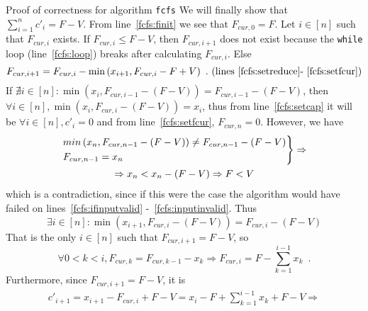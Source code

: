 \begin{sepproof}{Proof of correctness for algorithm \texttt{fcfs}}
   We will finally show that $\sum\limits_{i=1}^{n}c'_i = F - V$. From line~\ref{fcfs:finit} we see that $F_{cur,0} = F$.
   Let $i \in [n]$ such that $F_{cur, i}$ exists. If $F_{cur, i} \leq F - V$, then $F_{cur,i+1}$ does not exist because the
   \texttt{while} loop (line~\ref{fcfs:loop}) breaks after calculating $F_{cur,i}$. Else
   \begin{equation*}
      F_{cur,i+1} = F_{cur,i} - \min{\left(x_{i+1}, F_{cur,i} - F + V\right)} \enspace.
      \mbox{ (lines~\ref{fcfs:setreduce}-~\ref{fcfs:setfcur})}
   \end{equation*}
   If $\nexists i \in [n]: \min{\left(x_i, F_{cur, i-1} - \left(F - V\right)\right)} = F_{cur,i-1} - \left(F - V\right)$,
   then $\forall i \in [n], \min{\left(x_i, F_{cur, i} - \left(F - V\right)\right)} = x_i$, thus from line~\ref{fcfs:setcap}
   it will be $\forall i \in [n], c'_i = 0$ and from line~\ref{fcfs:setfcur}, $F_{cur, n} = 0$. However, we have
   \begin{equation*}
   \begin{gathered}
   \begin{rcases}
      min\left(x_n, F_{cur, n-1} - \left(F - V\right)\right) \neq F_{cur, n-1} - \left(F - V\right) \\
      F_{cur, n-1} = x_n
   \end{rcases} \Rightarrow \\
   \Rightarrow x_n < x_n - \left(F - V\right) \Rightarrow F < V
   \end{gathered}
   \end{equation*}
   which is a contradiction, since if this were the case the algorithm would have failed on lines~\ref{fcfs:ifinputvalid}
   -~\ref{fcfs:inputinvalid}. Thus
   \begin{equation*}
      \exists i \in [n]: \min{\left(x_{i+1}, F_{cur, i} - \left(F - V\right)\right)} = F_{cur,i} - \left(F - V\right)
   \end{equation*}
   That is the only $i \in [n]$ such that $F_{cur,i+1} = F - V$, so
   \begin{equation*}
      \forall 0 < k < i, F_{cur,k} = F_{cur,k-1} - x_k \Rightarrow F_{cur,i} = F - \sum\limits_{k=1}^{i-1}x_k \enspace.
   \end{equation*}
   Furthermore, since $F_{cur,i+1} = F - V$, it is
   \begin{equation*}
   \begin{gathered}
      c'_{i+1} = x_{i+1} - F_{cur,i} + F - V = x_i - F + \sum\limits_{k=1}^{i-1}x_k + F - V \Rightarrow \\

\end{gathered}
\end{equation*}
\end{sepproof}
